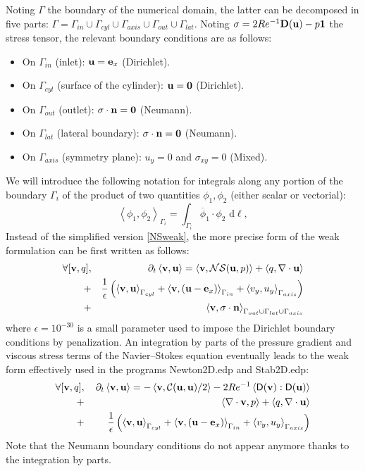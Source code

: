 \documentclass[twocolumn,10pt]{asme2ej}
\begin{document}
Noting $\Gamma$ the boundary of the numerical domain, the latter can be decomposed in five parts: 
$\Gamma = \Gamma_{in} \cup \Gamma_{cyl} \cup \Gamma_{axis} \cup \Gamma_{out} \cup \Gamma_{lat}$. 
Noting $\sigma = 2 Re^{-1} {\bf D}({\bf u}) - p {\bf 1}$ the stress tensor, the relevant boundary conditions are as follows:
\begin{itemize}
\item On $\Gamma_{in}$ (inlet): ${\bf u} = {\bf e}_x$ (Dirichlet).
\item On $\Gamma_{cyl}$ (surface of the cylinder): ${\bf u} = {\bf 0}$ (Dirichlet).
\item On $\Gamma_{out}$ (outlet): $\sigma \cdot {\bf n} = {\bf 0}$ (Neumann). 
\item On $\Gamma_{lat}$ (lateral boundary):  $\sigma \cdot {\bf n} = {\bf 0}$ (Neumann). 
\item On $\Gamma_{axis}$ (symmetry plane): $u_y = 0$ and $\sigma_{xy} = 0$ (Mixed). 
\end{itemize}
We will introduce the following notation for integrals along any portion of the boundary $\Gamma_i$ of the product of two quantities $\phi_1, \phi_2$ (either scalar or vectorial):
$$
\left< \phi_1, \phi_2 \right>_{\Gamma_i} = \int_{\Gamma_i}  \overline{\phi}_1 \cdot \phi_2   \mbox{ d} \ell,
$$
Instead of the simplified version \eqref{NSweak}, the more precise form of the weak formulation can be first written as follows:
\begin{eqnarray}
\label{NSweakFull}
\forall [{\bf v},q], &&\quad \partial_t \left< {\bf v}, {\bf u}\right> = \left< {\bf v} , {\cal NS} ({\bf u},p) \right> + \left< q, \nabla \cdot {\bf u}\right>\\
+ &&\frac{1}{\epsilon} \left(  \left< {\bf v}, \bf{u} \right>_{\Gamma_{cyl}} + \left< {\bf v}, ({\bf u}- {\bf e}_x ) \right>_{\Gamma_{in}} 
+ \left< v_y, u_y\right>_{\Gamma_{axis}} \right) \nonumber \\
+ && \left< {\bf v}, \sigma \cdot {\bf n} \right>_{\Gamma_{out} \cup  \Gamma_{lat} \cup \Gamma_{axis} }  \nonumber 
\end{eqnarray}
where $\epsilon=10^{-30}$ is a small parameter used to impose the Dirichlet boundary conditions by penalization.
An integration by parts of the pressure gradient and viscous stress terms of the Navier--Stokes equation eventually 
leads to the weak form effectively used in the programs {\sf Newton2D.edp} and {\sf Stab2D.edp}:
\begin{eqnarray}
\forall [{\bf v},q], &&\, \partial_t \left< {\bf v}, {\bf u}\right> = - \left< {\bf v} , {\cal C}({\bf u},{\bf u})/2 \right>
- 2 Re^{-1} \left< {\mathsf D}({\bf v}): {\mathsf D}({\bf u})  \right>  \nonumber \\
+ &&\left< \nabla \cdot {\bf v}, p \right> + \left< q, \nabla \cdot {\bf u} \right> \label{NSweakFullN} \\
+ &&\frac{1}{\epsilon} \left(  \left< {\bf v}, \bf{u} \right>_{\Gamma_{cyl}} + \left< {\bf v}, ({\bf u}- {\bf e}_x ) \right>_{\Gamma_{in}} 
+ \left< v_y, u_y\right>_{\Gamma_{axis}} \right) \nonumber 
\end{eqnarray}
Note that the Neumann boundary conditions do not appear anymore thanks to the integration by parts.
\end{document}
